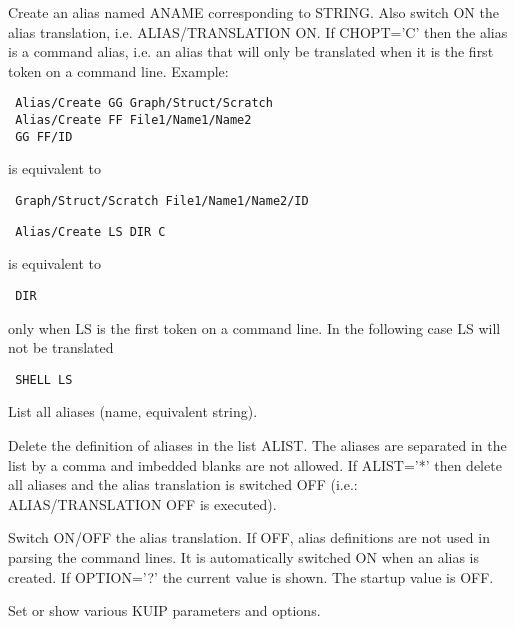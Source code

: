 \BEGARG
{}
\ENDARG
\BEGTEXT
Create an alias named ANAME corresponding to STRING.
Also switch ON the alias translation, i.e. ALIAS/TRANSLATION ON.
If CHOPT='C' then the alias is a command alias, i.e. an alias that
will only be translated when it is the first token on a command line.
Example:
\begin{verbatim}
 Alias/Create GG Graph/Struct/Scratch
 Alias/Create FF File1/Name1/Name2
 GG FF/ID
\end{verbatim}
is equivalent to
\begin{verbatim}
 Graph/Struct/Scratch File1/Name1/Name2/ID
\end{verbatim}

\begin{verbatim}
 Alias/Create LS DIR C
\end{verbatim}
is equivalent to
\begin{verbatim}
 DIR
\end{verbatim}
only when LS is the first token on a command line. In the following case
LS will not be translated
\begin{verbatim}
 SHELL LS
\end{verbatim}
\ENDTEXT

\BEGARG
\ENDARG
\BEGTEXT
List all aliases (name, equivalent string).
\ENDTEXT

\BEGARG
{}
\ENDARG
\BEGTEXT
Delete the definition of aliases in the list ALIST.
The aliases are separated in the list by a comma and
imbedded blanks are not allowed.
If ALIST='*' then delete all aliases
and the alias translation is switched OFF
(i.e.: ALIAS/TRANSLATION OFF is executed).
\ENDTEXT

\BEGARG
{}
\ENDARG
\BEGTEXT
Switch ON/OFF the alias translation.
If OFF, alias definitions are not used in parsing the command lines.
It is automatically switched ON when an alias is created.
If OPTION='?' the current value is shown.
The startup value is OFF.
\ENDTEXT


\BEGTEXT
Set or show various KUIP parameters and options.
\ENDTEXT


